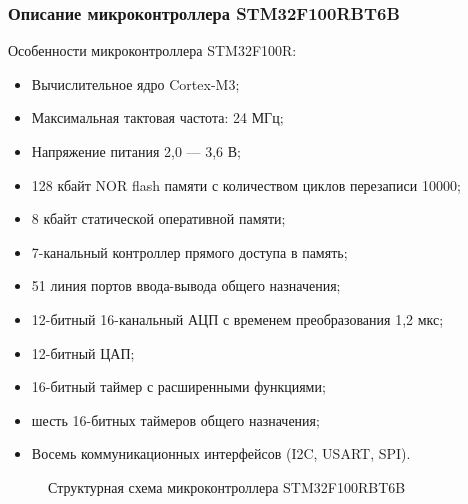     \subsubsection{Описание микроконтроллера STM32F100RBT6B}
        Особенности микроконтроллера STM32F100R:
        \begin{itemize}
            \item Вычислительное ядро Cortex-M3;
            \item Максимальная тактовая частота: 24 МГц;
            \item Напряжение питания 2,0 — 3,6 В;
            \item 128 кбайт NOR flash памяти с количеством циклов перезаписи 10000;
            \item 8 кбайт статической оперативной памяти;
            \item 7-канальный контроллер прямого доступа в память;
            \item 51 линия портов ввода-вывода общего назначения;
            \item 12-битный 16-канальный АЦП с временем преобразования 1,2 мкс;
            \item 12-битный ЦАП;
            \item 16-битный таймер с расширенными функциями;
            \item шесть 16-битных таймеров общего назначения;
            \item Восемь коммуникационных интерфейсов (I2C, USART, SPI).
        \end{itemize}

        \begin{figure}
            \caption{Структурная схема микроконтроллера STM32F100RBT6B}
            \label{fig:stm32f100rbt6b}
        \end{figure}       
        

